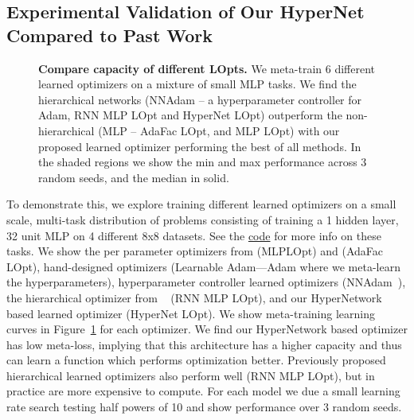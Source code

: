 \documentclass[11pt]{article}
\begin{document}
\subsection{Experimental Validation of Our HyperNet Compared to Past Work}

\begin{figure}
    \centering
    \vspace{-1em}
    \caption{\textbf{Compare capacity of different LOpts.} We meta-train 6 different learned optimizers on a mixture of small MLP tasks. We find the hierarchical networks (NNAdam -- a hyperparameter controller for Adam, RNN MLP LOpt and HyperNet LOpt) outperform the non-hierarchical (MLP -- AdaFac LOpt, and MLP LOpt) with our proposed learned optimizer performing the best of all methods. In the shaded regions we show the min and max performance across 3 random seeds, and the median in solid.
    \label{fig:capacity_perf}
    }
\end{figure}

To demonstrate this, we explore training different learned optimizers on a small scale, multi-task distribution of problems consisting of training a 1 hidden layer, 32 unit MLP on 4 different 8x8 datasets. See the \href{https://github.com/google/learned_optimization/blob/c8a4d4dac6987d70020e9894d871a493d9c21e72/learned_optimization/research/general_lopt/tasks/fast_mlp_diff_data.py#L58}{code} for more info on these tasks.
We show the per parameter optimizers from \citet{metz2019understanding} (MLPLOpt) and \citet{metz2022practical} (AdaFac LOpt), hand-designed optimizers (Learnable Adam---Adam where we meta-learn the hyperparameters), hyperparameter controller learned optimizers (NNAdam~\citep{metz2022practical}), the hierarchical optimizer from ~\citet{metz2020tasks} (RNN MLP LOpt), and our HyperNetwork based learned optimizer (HyperNet LOpt).
We show meta-training learning curves in Figure~\ref{fig:capacity_perf} for each optimizer.
We find our HyperNetwork based optimizer has low meta-loss, implying that this architecture has a higher capacity and thus can learn a function which performs optimization better. Previously proposed hierarchical learned optimizers also perform well (RNN MLP LOpt), but in practice are more expensive to compute. For each model we due a small learning rate search testing half powers of 10 and show performance over 3 random seeds.
\end{document}
